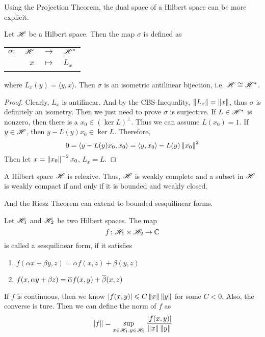 \documentclass[a4paper,11pt]{report}
\begin{document}
Using the Projection Theorem, the dual space of a Hilbert space can be more explicit.
\begin{thm}
	Let $\mathscr{H}$ be a Hilbert space. Then the map $\sigma$ is defined as
	\begin{center}
		\begin{tabular}{l r c l}
			$\sigma \colon$ & $\mathscr{H}$ & $\longrightarrow$ & $\mathscr{H}^{*}$ \\
			~ & $x$ & $\longmapsto$ & $L_x$
		\end{tabular}
	\end{center}
	where $L_x(y)= \langle y,x \rangle$. Then $\sigma$ is an isometric antilinear bijection, i.e. $\mathscr{H} \cong \mathscr{H}^{*}$.
\end{thm}
\begin{proof}
	Clearly, $L_x$ is antilinear. And by the CBS-Inequality, $\left\lVert L_x\right\lVert = \left\lVert x\right\lVert$, thus $\sigma$ is definitely an isometry. Then we just need to prove $\sigma$ is surjective. If $L \in \mathscr{H}^{*}$ is nonzero, then there is a $x_0 \in (\ker{L})^{\bot}$. Thus we can assume $L(x_0) = 1$. If $y \in \mathscr{H}$, then $y-L(y)x_0 \in \ker{L}$. Therefore,
	\begin{equation*}
		0= \langle y-L(y)x_0,x_0 \rangle= \langle y,x_0 \rangle-L(y)\left\lVert x_0\right\lVert^{2}
	\end{equation*}
	Then let $x = \left\lVert x_0\right\lVert^{-2} x_0$, $L_x=L$.
\end{proof}
\begin{cor}
	A Hilbert space $\mathscr{H}$ is relexive. Thus, $\mathscr{H}$ is weakly complete and a subset in $\mathscr{H}$ is weakly compact if and only if it is bounded and weakly closed.
\end{cor}

And the Riesz Theorem can extend to bounded sesquilinear forms.
\begin{defn}
	Let $\mathscr{H}_1$ and $\mathscr{H}_2$ be two Hilbert spaces. The map 
	\begin{equation*}
		f \colon \mathscr{H}_1 \times \mathscr{H}_2 \rightarrow \mathbb{C}
	\end{equation*}
	is called a sesquilinear form, if it satisfies
	\begin{enumerate}[label=\arabic*)]
	 	\item $f(\alpha x + \beta y,z) = \alpha f(x,z) + \beta (y,z)$
	 	\item $f(x,\alpha y + \beta z) = \overline{\alpha} f(x,y) + \overline{\beta} (x,z)$
	\end{enumerate}
\end{defn}
\begin{rem}
	If $f$ is continuous, then we know $\left\lvert f(x,y)\right\lvert \leqslant C\left\lVert x\right\lVert\left\lVert y\right\lVert$ for some $C < 0$. Also, the converse is ture. Then we can define the norm of $f$ as
	\begin{equation*}
		\left\lVert f\right\lVert =\sup_{x \in \mathscr{H}_1, y \in \mathscr{H}_2} \frac{\left\lvert f(x,y)\right\lvert}{\left\lVert x\right\lVert\left\lVert y\right\lVert}
	\end{equation*} 
\end{rem}
\end{document}
